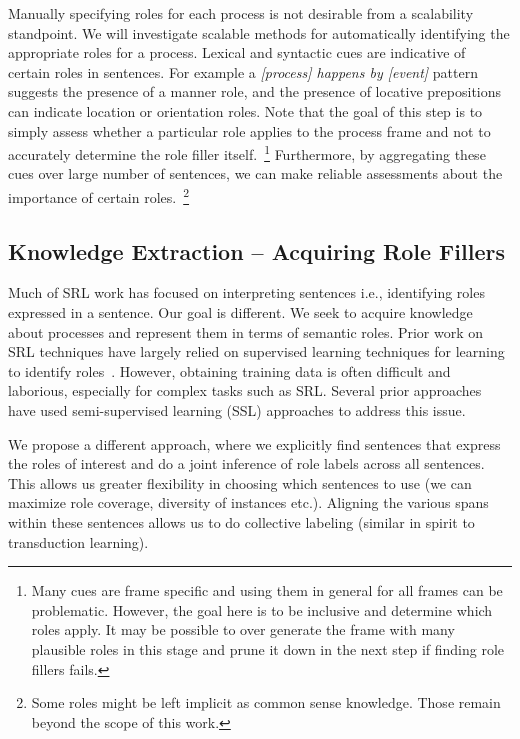 %

Manually specifying roles for each process is not desirable from a scalability standpoint.
We will investigate scalable methods for automatically identifying the appropriate roles for a process. 
Lexical and syntactic cues are indicative of certain roles in sentences. 
For example a {\em [process] happens by [event]} pattern suggests the presence of a manner role, and the presence of locative prepositions can indicate location or orientation roles. 
Note that the goal of this step is to simply assess whether a particular role applies to the process frame and not to accurately determine the role filler itself.~\footnote{
Many cues are frame specific and using them in general for all frames can be problematic. 
However, the goal here is to be inclusive and determine which roles apply. 
It may be possible to over generate the frame with many plausible roles in this stage and prune it down in the next step if finding role fillers fails.} 
Furthermore, by aggregating these cues over large number of sentences, we can make reliable assessments about the importance of certain roles.~\footnote{
Some roles might be left implicit as common sense knowledge. 
Those remain beyond the scope of this work.} 

\subsection{Knowledge Extraction -- Acquiring Role Fillers}

Much of SRL work has focused on interpreting sentences i.e., identifying roles expressed in a sentence.
Our goal is different. We seek to acquire knowledge about processes and represent them in terms of semantic roles.
Prior work on SRL techniques have largely relied on supervised learning techniques for learning to identify roles~\cite{}.
However, obtaining training data is often difficult and laborious, especially for complex tasks such as SRL.
Several prior approaches have used semi-supervised learning (SSL) approaches to address this issue. 

We propose a different approach, where we explicitly find sentences that express the roles of interest and do a joint inference of role labels across all sentences. 
This allows us greater flexibility in choosing which sentences to use (we can maximize role coverage, diversity of instances etc.).
Aligning the various spans within these sentences allows us to do collective labeling (similar in spirit to transduction learning).

